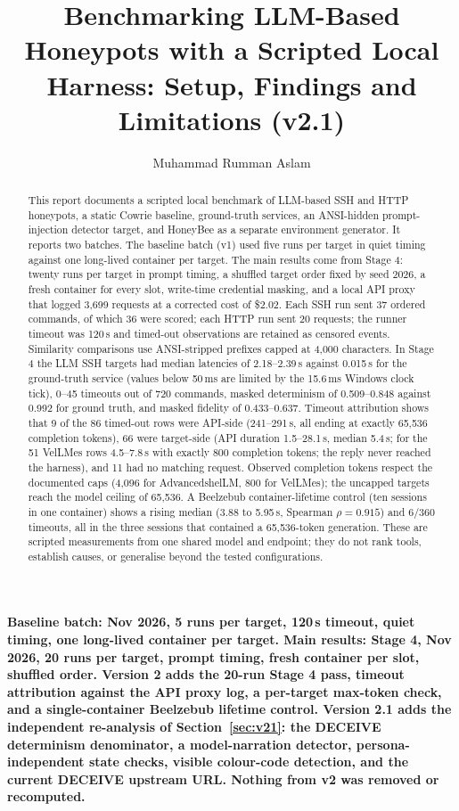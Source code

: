 \documentclass[a4paper,11pt]{article}
\title{\textbf{Benchmarking LLM-Based Honeypots with a Scripted Local Harness:
Setup, Findings and Limitations (v2.1)}}
\author{Muhammad Rumman Aslam}
\date{}
\begin{document}
\maketitle

\begin{center}
\textbf{Baseline batch: Nov 2026, 5 runs per target, 120\,s timeout, quiet
timing, one long-lived container per target. Main results: Stage 4, Nov 2026,
20 runs per target, prompt timing, fresh container per slot, shuffled order.
Version 2 adds the 20-run Stage 4 pass, timeout attribution against the API
proxy log, a per-target max-token check, and a single-container
Beelzebub lifetime control. Version 2.1 adds the independent re-analysis of
Section~\ref{sec:v21}: the DECEIVE determinism denominator, a model-narration
detector, persona-independent state checks, visible colour-code detection, and
the current DECEIVE upstream URL. Nothing from v2 was removed or recomputed.}
\end{center}

\begin{abstract}
This report documents a scripted local benchmark of LLM-based SSH and HTTP
honeypots, a static Cowrie baseline, ground-truth services, an ANSI-hidden
prompt-injection detector target, and HoneyBee as a separate environment
generator. It reports two batches. The baseline batch (v1) used five runs per
target in quiet timing against one long-lived container per target. The main
results come from Stage 4: twenty runs per target in prompt timing, a shuffled
target order fixed by seed 2026, a fresh container for every slot, write-time
credential masking, and a local API proxy that logged 3,699 requests at a
corrected cost of \$2.02. Each SSH run sent 37 ordered commands, of which 36
were scored; each HTTP run sent 20 requests; the runner timeout was 120\,s and
timed-out observations are retained as censored events. Similarity comparisons
use ANSI-stripped prefixes capped at 4,000 characters. In Stage 4 the LLM SSH
targets had median latencies of 2.18--2.39\,s against 0.015\,s for the
ground-truth service (values below 50\,ms are limited by the 15.6\,ms Windows
clock tick), 0--45 timeouts out of 720 commands, masked determinism of
0.509--0.848 against 0.992 for ground truth, and masked fidelity of
0.433--0.637. Timeout attribution shows that 9 of the 86 timed-out rows were
API-side (241--291\,s, all ending at exactly 65,536 completion tokens), 66 were
target-side (API duration 1.5--28.1\,s, median 5.4\,s; for the 51 VelLMes rows
4.5--7.8\,s with exactly 800 completion tokens; the reply never reached the
harness), and 11 had no matching request. Observed completion tokens respect
the documented caps (4,096 for AdvancedshelLM, 800 for VelLMes); the uncapped
targets reach the model ceiling of 65,536. A Beelzebub container-lifetime
control (ten sessions in one container) shows a rising median (3.88 to
5.95\,s, Spearman $\rho=0.915$) and 6/360 timeouts, all in the three sessions
that contained a 65,536-token generation. These are scripted measurements from
one shared model and endpoint; they do not rank tools, establish causes, or
generalise beyond the tested configurations.
\end{abstract}
\end{document}
